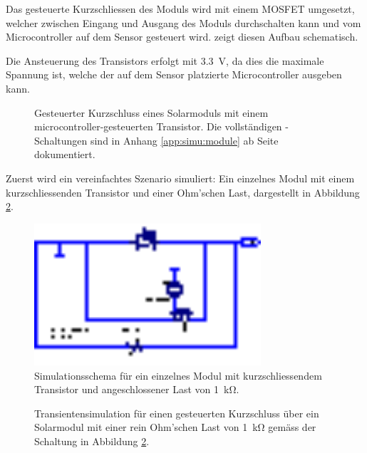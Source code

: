 Das  gesteuerte Kurzschliessen  des Moduls  wird mit  einem MOSFET  umgesetzt,
welcher zwischen  Eingang und  Ausgang des Moduls  durchschalten kann  und vom
Microcontroller auf dem Sensor gesteuert wird. 
zeigt diesen Aufbau schematisch.

Die  Ansteuerung des  Transistors  erfolgt mit  \SI{3.3}{\volt},  da dies  die
maximale Spannung  ist, welche der  auf dem Sensor  platzierte Microcontroller
ausgeben kann.

\begin{figure}[h!tb]
    \centering
    
    \caption{%
        Gesteuerter     Kurzschluss     eines    Solarmoduls     mit     einem
        microcontroller-gesteuerten       Transistor. Die      vollst\"andigen
        -Schaltungen  sind  in Anhang  \ref{app:simu:module}  ab
        Seite \pageref{app:simu:module} dokumentiert.%
    }
    \label{fig:module:mosfet:simple}
\end{figure}


Zuerst wird ein vereinfachtes Szenario simuliert: Ein einzelnes Modul mit einem
kurzschliessenden Transistor und einer Ohm'schen Last, dargestellt in Abbildung
\ref{fig:ltspice:shortCircuit:simple}.

\begin{figure}[h!tb]
    \centering
    \includegraphics[width=0.75\textwidth]{images/ltspice/jac/shortcircuit-single.eps}
    \caption{
        Simulationsschema  f\"ur  ein  einzelnes Modul  mit  kurzschliessendem
        Transistor und angeschlossener Last von \SI{1}{\kilo\ohm}.%
    }
    \label{fig:ltspice:shortCircuit:simple}
\end{figure}

\begin{figure}[h!tb]
    
    \caption{%
        Transientensimulation    f\"ur     einen    gesteuerten    Kurzschluss
        \"uber    ein   Solarmodul    mit    einer    rein   Ohm'schen    Last
        von   \SI{1}{\kilo\ohm}   gem\"ass    der   Schaltung   in   Abbildung
        \ref{fig:ltspice:shortCircuit:simple}.%
    }
    \label{fig:simu:shortCircuit:simple:tran}
\end{figure}

